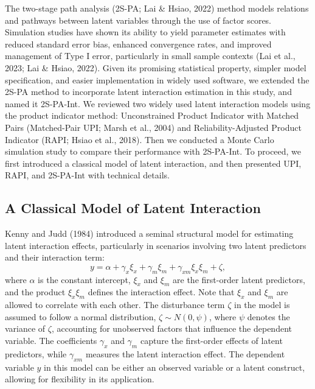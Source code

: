 \documentclass[
  man]{apa6}
\begin{document}
The two-stage path analysis (2S-PA; Lai \& Hsiao, 2022) method models relations and pathways between latent variables through the use of factor scores. Simulation studies have shown its ability to yield parameter estimates with reduced standard error bias, enhanced convergence rates, and improved management of Type I error, particularly in small sample contexts (Lai et al., 2023; Lai \& Hsiao, 2022). Given its promising statistical property, simpler model specification, and easier implementation in widely used software, we extended the 2S-PA method to incorporate latent interaction estimation in this study, and named it 2S-PA-Int. We reviewed two widely used latent interaction models using the product indicator method: Unconstrained Product Indicator with Matched Pairs (Matched-Pair UPI; Marsh et al., 2004) and Reliability-Adjusted Product Indicator (RAPI; Hsiao et al., 2018). Then we conducted a Monte Carlo simulation study to compare their performance with 2S-PA-Int. To proceed, we first introduced a classical model of latent interaction, and then presented UPI, RAPI, and 2S-PA-Int with technical details.

\subsection{A Classical Model of Latent Interaction}\label{a-classical-model-of-latent-interaction}

Kenny and Judd (1984) introduced a seminal structural model for estimating latent interaction effects, particularly in scenarios involving two latent predictors and their interaction term:
\begin{equation}
y = \alpha + \gamma_{x}\xi_{x} + \gamma_{m}\xi_{m} + \gamma_{xm}\xi_{x}\xi_{m} + \zeta,
\end{equation}
where \(\alpha\) is the constant intercept, \(\xi_{x}\) and \(\xi_{m}\) are the first-order latent predictors, and the product \(\xi_{x}\xi_{m}\) defines the interaction effect. Note that \(\xi_{x}\) and \(\xi_{m}\) are allowed to correlate with each other. The disturbance term \(\zeta\) in the model is assumed to follow a normal distribution, \(\zeta \sim N(0, \psi)\), where \(\psi\) denotes the variance of \(\zeta\), accounting for unobserved factors that influence the dependent variable. The coefficients \(\gamma_{x}\) and \(\gamma_{m}\) capture the first-order effects of latent predictors, while \(\gamma_{xm}\) measures the latent interaction effect. The dependent variable \(y\) in this model can be either an observed variable or a latent construct, allowing for flexibility in its application.
\end{document}
